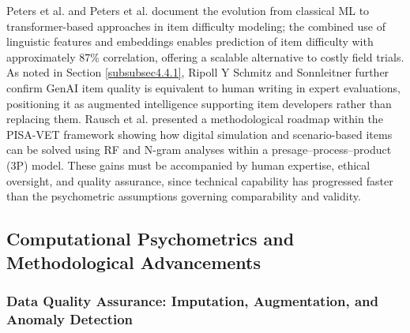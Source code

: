 \documentclass{ieeeaccess}
\begin{document}
Peters et al. \cite{peters-etal2025} and Peters et al. \cite{peters-etal2025a} document the evolution from classical ML to transformer-based approaches in item difficulty modeling; the combined use of linguistic features and embeddings enables prediction of item difficulty with approximately 87\% correlation, offering a scalable alternative to costly field trials. As noted in Section \ref{subsubsec4.4.1}, Ripoll Y Schmitz and Sonnleitner \cite{ripollyschmitz-etal2025} further confirm GenAI item quality is equivalent to human writing in expert evaluations, positioning it as augmented intelligence supporting item developers rather than replacing them. Rausch et al. \cite{rausch-etal2024} presented a methodological roadmap within the PISA-VET framework showing how digital simulation and scenario-based items can be solved using RF and N-gram analyses within a presage--process--product (3P) model. These gains must be accompanied by human expertise, ethical oversight, and quality assurance, since technical capability has progressed faster than the psychometric assumptions governing comparability and validity.

\subsection{Computational Psychometrics and Methodological Advancements}\label{subsec4.5}

\subsubsection{Data Quality Assurance: Imputation, Augmentation, and Anomaly Detection}\label{subsubsec4.5.1}
\end{document}
